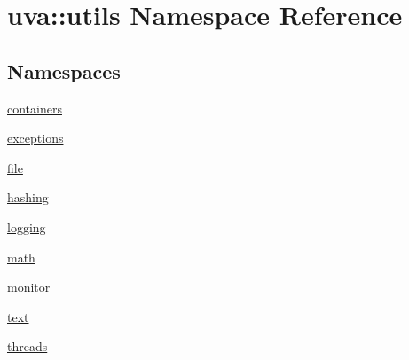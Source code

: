 \hypertarget{namespaceuva_1_1utils}{}\section{uva\+:\+:utils Namespace Reference}
\label{namespaceuva_1_1utils}
\subsection*{Namespaces}
\begin{DoxyCompactItemize}
\item 
 \hyperlink{namespaceuva_1_1utils_1_1containers}{containers}
\item 
 \hyperlink{namespaceuva_1_1utils_1_1exceptions}{exceptions}
\item 
 \hyperlink{namespaceuva_1_1utils_1_1file}{file}
\item 
 \hyperlink{namespaceuva_1_1utils_1_1hashing}{hashing}
\item 
 \hyperlink{namespaceuva_1_1utils_1_1logging}{logging}
\item 
 \hyperlink{namespaceuva_1_1utils_1_1math}{math}
\item 
 \hyperlink{namespaceuva_1_1utils_1_1monitor}{monitor}
\item 
 \hyperlink{namespaceuva_1_1utils_1_1text}{text}
\item 
 \hyperlink{namespaceuva_1_1utils_1_1threads}{threads}
\end{DoxyCompactItemize}
